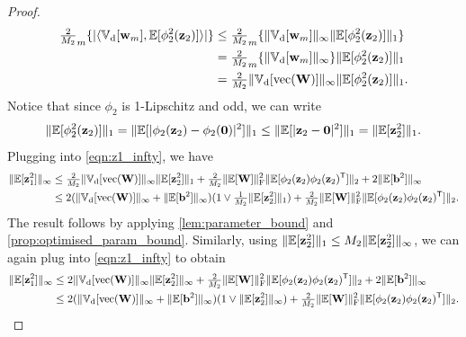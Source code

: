 \documentclass[twoside]{article}
\renewcommand{\ss}[1]{_{\text{#1}}}
\newcommand{\vnull}{\mathbf{0}}
\newcommand{\vb}{\mathbf{b}}
\newcommand{\vw}{\mathbf{w}}
\newcommand{\vz}{\mathbf{z}}
\newcommand{\mW}{\mathbf{W}}
\newcommand{\E}{\mathbb{E}}
\newcommand{\V}{\mathbb{V}}
\newcommand{\T}{\text{\textsf{T}}}
\newcommand{\opspace}{}
\let\max\relax\DeclareMathOperator*{\max}{max\opspace}
\renewcommand{\ss}[1]{_{\text{#1}}}        %
\DeclarePairedDelimiter\lra{\langle}{\rangle}    %
\DeclarePairedDelimiter\norm{\|}{\|}             %
\DeclarePairedDelimiter\abs{|}{|}                %
\theoremstyle{theoremstyle}
\begin{document}
\begin{proof}
\begin{align}
        \tfrac2{M_2} \max_m \{\abs{\lra{\V\ss{d}[\vw_m], \E[\phi_2^2(\vz_{2})]}} \} 
        &\le \tfrac2{M_2} \max_m \{ \norm{\V\ss{d}[\vw_m]}_\infty \norm{\E[\phi_2^2(\vz_{2})]}_1 \} \\
        &= \tfrac2{M_2} \max_m \{ \norm{\V\ss{d}[\vw_m]}_\infty \} \norm{\E[\phi_2^2(\vz_{2})]}_1 \\
        &= \tfrac2{M_2} \norm{\V\ss{d}[\operatorname{vec}(\mW)]}_\infty \norm{\E[\phi_2^2(\vz_{2})]}_1.
    \end{align}
    Notice that since $\phi_2$ is 1-Lipschitz and odd, we can write
    \begin{align}
        \norm{\E[\phi_2^2(\vz_{2})]}_1
        = \norm{\E[\abs{\phi_2(\vz_{2}) - \phi_2(\vnull) }^2]}_1
        \le \norm{\E[\abs{\vz_{2} - \vnull}^2]}_1
        = \norm{\E[\vz_{2}^2]}_1.
    \end{align}
    Plugging into \cref{eqn:z1_infty},  we have
    \begin{align}
        \norm{\E[\vz_1^2]}_\infty 
        &\le \tfrac2{M_2} \norm{\V\ss{d}[\operatorname{vec}(\mW)]}_\infty \norm{\E[\vz_{2}^2]}_1
        + \tfrac2{M_2} \norm{\E[\mW]}\ss{F}^2 \norm{\E[\phi_2(\vz_{2})\phi_2(\vz_{2})^\T]}_2
        + 2 \norm{\E[\vb^2]}_\infty \\
        &\le
            2(
            \norm{\V\ss{d}[\operatorname{vec}(\mW)]}_\infty
                + \norm{\E[\vb^2]}_\infty
            ) (1 \lor \tfrac1{M_2} \norm{\E[\vz_{2}^2]}_1)
            + \tfrac2{M_2} \norm{\E[\mW]}\ss{F}^2 \norm{\E[\phi_2(\vz_{2})\phi_2(\vz_{2})^\T]}_2.
    \end{align}
    The result follows by applying \cref{lem:parameter_bound} and \cref{prop:optimised_param_bound}.
    Similarly, using $\norm{\E[\vz_{2}^2]}_1 \le M_2 \norm{\E[\vz_{2}^2]}_\infty$, we can again plug into \cref{eqn:z1_infty} to obtain
    \begin{align}
        \norm{\E[\vz_1^2]}_\infty 
        &\le 2 \norm{\V\ss{d}[\operatorname{vec}(\mW)]}_\infty \norm{\E[\vz_{2}^2]}_\infty
        + \tfrac2{M_2} \norm{\E[\mW]}\ss{F}^2 \norm{\E[\phi_2(\vz_{2})\phi_2(\vz_{2})^\T]}_2
        + 2 \norm{\E[\vb^2]}_\infty \\
        &\le
            2(
            \norm{\V\ss{d}[\operatorname{vec}(\mW)]}_\infty
                + \norm{\E[\vb^2]}_\infty
            ) (1 \lor \norm{\E[\vz_{2}^2]}_\infty)
            + \tfrac2{M_2} \norm{\E[\mW]}\ss{F}^2 \norm{\E[\phi_2(\vz_{2})\phi_2(\vz_{2})^\T]}_2.
    \end{align}
\end{proof}
\end{document}
